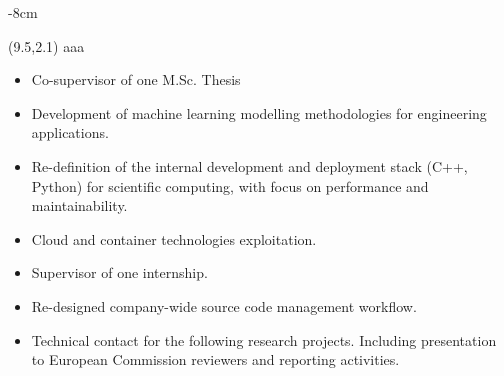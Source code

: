 \documentclass[10pt,a4paper]{altacv}
\begin{document}


\begin{adjustwidth}{}{-8cm}
\makecvheader
\end{adjustwidth}

\vspace{0.5cm}
\begin{textblock}{10}(9.5,2.1)
  \centering
	aaa
  \vspace{250mm}
\end{textblock}




\divider

\smallskip
\begin{itemize}
\item Co-supervisor of one M.Sc. Thesis
\end{itemize}


\begin{itemize}
\item Development of machine learning modelling methodologies for engineering applications.
\item Re-definition of the internal development and deployment stack (C++, Python) for scientific computing, with focus on performance and maintainability.
\item Cloud and container technologies exploitation.
\item Supervisor of one internship.
\item Re-designed company-wide source code management workflow.
\item Technical contact for the following research projects. Including presentation to European Commission reviewers and reporting activities.
\end{itemize}
\end{document}
